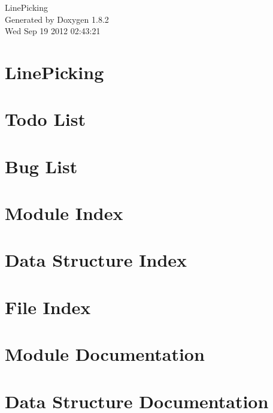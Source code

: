 \documentclass{book}
\begin{document}
\hypersetup{pageanchor=false,citecolor=blue}
\begin{titlepage}
\vspace*{7cm}
\begin{center}
{\Large Line\-Picking }\\
\vspace*{1cm}
{\large Generated by Doxygen 1.8.2}\\
\vspace*{0.5cm}
{\small Wed Sep 19 2012 02:43:21}\\
\end{center}
\end{titlepage}
\clearemptydoublepage
{}
\tableofcontents
\clearemptydoublepage
{}
\hypersetup{pageanchor=true,citecolor=blue}
\chapter{Line\-Picking}
\label{index}\hypertarget{index}{}
\chapter{Todo List}
\label{todo}
\hypertarget{todo}{}

\chapter{Bug List}
\label{bug}
\hypertarget{bug}{}

\chapter{Module Index}

\chapter{Data Structure Index}

\chapter{File Index}

\chapter{Module Documentation}



\chapter{Data Structure Documentation}



\end{document}
